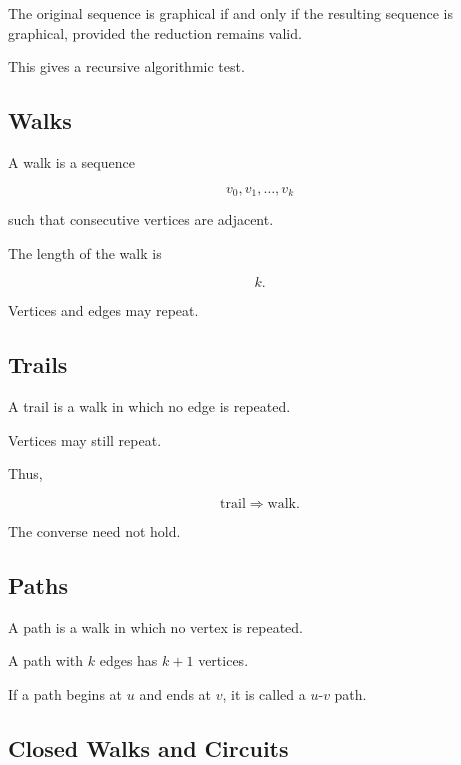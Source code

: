 The original sequence is graphical if and only if the resulting
sequence is graphical, provided the reduction remains valid.

This gives a recursive algorithmic test.

\subsection{Walks}
\label{subsec:graph-walks}

A walk is a sequence

\[
v_0,v_1,\ldots,v_k
\]

such that consecutive vertices are adjacent.

The length of the walk is

\[
k.
\]

Vertices and edges may repeat.

\subsection{Trails}
\label{subsec:graph-trails}

A trail is a walk in which no edge is repeated.

Vertices may still repeat.

Thus,

\[
\boxed{
\text{trail}
\Longrightarrow
\text{walk}.
}
\]

The converse need not hold.

\subsection{Paths}
\label{subsec:graph-paths}

A path is a walk in which no vertex is repeated.

A path with \(k\) edges has \(k+1\) vertices.

If a path begins at \(u\) and ends at \(v\), it is called a
\(u\)-\(v\) path.

\subsection{Closed Walks and Circuits}
\label{subsec:closed-walks-circuits}

